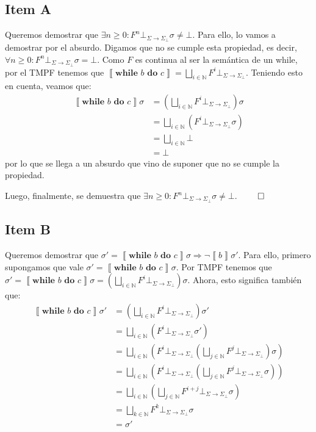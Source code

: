 \documentclass{article}
\newcommand{\sem}[1]{\left\llbracket #1\right\rrbracket}
\newcommand{\N}{\mathbb{N}}
\newcommand{\supr}{\bigsqcup\limits}
\newcommand{\cdom}{\Sigma \to \Sigma_\bot}
\newcommand{\cfbot}{\bot_{\cdom}}
\newcommand{\cwhile}[2]{\textbf{while }#1\textbf{ do }#2}
\begin{document}
\subsection*{Item A}
Queremos demostrar que $\exists n \geq 0 : F^n \cfbot \sigma \neq \bot$.
Para ello, lo vamos a demostrar por el absurdo.
Digamos que no se cumple esta propiedad, es decir, $\forall n \geq 0 : F^n \cfbot \sigma = \bot$.
Como $F$ es continua al ser la semántica de un while, por el TMPF tenemos que $\sem{\cwhile{b}{c}} = \supr_{i \in \N} F^i \cfbot$.
Teniendo esto en cuenta, veamos que:
\begin{equation*}
  \begin{aligned}
    \sem{\cwhile{b}{c}} \sigma &= \left(\supr_{i \in \N} F^i \cfbot\right) \sigma \\ 
                               &= \supr_{i \in \N} (F^i \cfbot \sigma) \\ 
                               &= \supr_{i \in \N} \bot \\ 
                               &= \bot 
  \end{aligned}
\end{equation*}
por lo que se llega a un absurdo que vino de suponer que no se cumple la propiedad.

Luego, finalmente, se demuestra que $\exists n \geq 0 : F^n \cfbot \sigma \neq \bot$. $\qed$

\subsection*{Item B}
Queremos demostrar que $\sigma' = \sem{\cwhile{b}{c}}\sigma \Rightarrow \neg\sem{b}\sigma'$.
Para ello, primero supongamos que vale $\sigma' = \sem{\cwhile{b}{c}}\sigma$.
Por TMPF tenemos que $\sigma' = \sem{\cwhile{b}{c}}\sigma = \left(\supr_{i \in \N} F^i \cfbot\right)\sigma$.
Ahora, esto significa también que:
\begin{equation*}
  \begin{aligned}
    \sem{\cwhile{b}{c}} \sigma' &= \left(\supr_{i \in \N} F^i \cfbot\right) \sigma' \\ 
                                &= \supr_{i \in \N} (F^i \cfbot \sigma') \\ 
                                &= \supr_{i \in \N} \left(F^i \cfbot \left(\supr_{j \in \N} F^j \cfbot\right) \sigma\right) \\ 
                                &= \supr_{i \in \N} \left(F^i \cfbot \left(\supr_{j \in \N} F^j \cfbot \sigma\right)\right) \\ 
                                &= \supr_{i \in \N} \left(\supr_{j \in \N} F^{i + j} \cfbot \sigma\right) \\ 
                                &= \supr_{k \in \N} F^k \cfbot \sigma \\ 
                                &= \sigma'
  \end{aligned}
\end{equation*}
\end{document}
